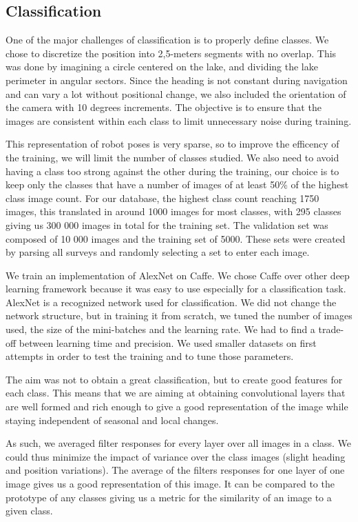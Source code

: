 \subsection{Classification}

One of the major challenges of classification is to properly define classes. We chose to discretize the position into 2,5-meters segments with no overlap. This was done by imagining a circle centered on the lake, and dividing the lake perimeter in angular sectors. Since the heading is not constant during navigation and can vary a lot without positional change, we also included the orientation of the camera with 10 degrees increments. The objective is to ensure that the images are consistent within each class to limit unnecessary noise during training. 

This representation of robot poses is very sparse, so to improve the efficency of the training, we will limit the number of classes studied. We also need to avoid having a class too strong against the other during the training, our choice is to keep only the classes that have a number of images of at least 50\% of the highest class image count. For our database, the highest class count reaching 1750 images, this translated in around 1000 images for most classes, with 295 classes giving us 300 000 images in total for the training set. The validation set was composed of 10 000 images and the training set of 5000. These sets were created by parsing all surveys and randomly selecting a set to enter each image.

We train an implementation of AlexNet on Caffe. We chose Caffe over other deep learning framework because it was easy to use especially for a classification task. AlexNet is a recognized network used for classification. We did not change the network structure, but in training it from scratch, we tuned the number of images used, the size of the mini-batches and the learning rate. We had to find a trade-off between learning time and precision. We used smaller datasets on first attempts in order to test the training and to tune those parameters.

The aim was not to obtain a great classification, but to create good features for each class. This means that we are aiming at obtaining convolutional layers that are well formed and rich enough to give a good representation of the image while staying independent of seasonal and local changes.

As such, we averaged filter responses for every layer over all images in a class. We could thus minimize the impact of variance over the class images (slight heading and position variations). The average of the filters responses for one layer of one image gives us a good representation of this image. It can be compared to the prototype of any classes giving us a metric for the similarity of an image to a given class. 
